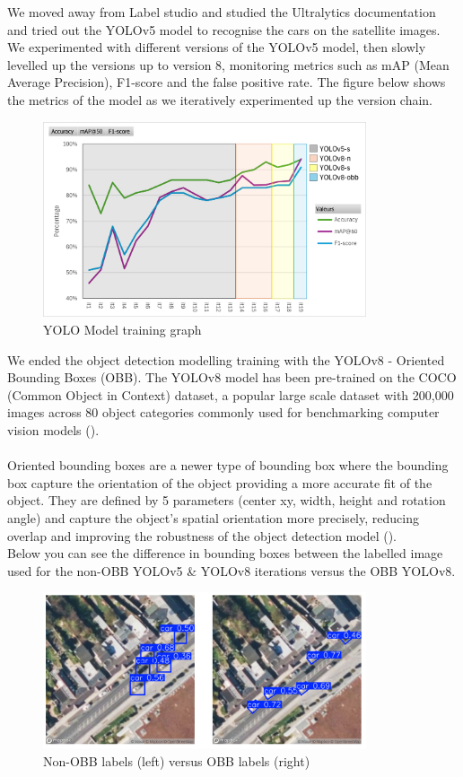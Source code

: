 We moved away from Label studio and studied the Ultralytics documentation and tried out the YOLOv5 model to recognise the cars on the satellite images. We experimented with different versions of the YOLOv5 model, then slowly levelled up the versions up to version 8, monitoring metrics such as mAP (Mean Average Precision), F1-score and the false positive rate. The figure below shows the metrics of the model as we iteratively experimented up the version chain.
\begin{figure}[h!]
  \centering
  \includegraphics[width=0.85\textwidth]{images/yolo-results.png}
  \caption{YOLO Model training graph}
\end{figure}
We ended the object detection modelling training with the YOLOv8 - Oriented Bounding Boxes (OBB). The YOLOv8 model has been pre-trained on the COCO (Common Object in Context) dataset, a popular large scale dataset with 200,000 images across 80 object categories commonly used for benchmarking computer vision models (\cite{cocodataset}).\\ \\
Oriented bounding boxes are a newer type of bounding box where the bounding box capture the orientation of the object providing a more accurate fit of the object. They are defined by 5 parameters (center xy, width, height and rotation angle) and capture the object's spatial orientation more precisely, reducing overlap and improving the robustness of the object detection model (\cite{obblit}).\\
Below you can see the difference in bounding boxes between the labelled image used for the non-OBB YOLOv5 \& YOLOv8 iterations versus the OBB YOLOv8.
\begin{figure}[h!]
  \centering
  \includegraphics[width=0.85\textwidth]{images/obb-vs-nonobb-img.png}
  \caption{Non-OBB labels (left) versus OBB labels (right)}
\end{figure}\\
